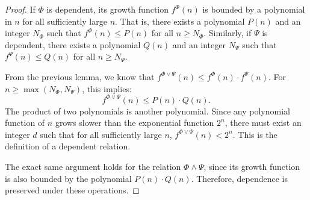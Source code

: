 \begin{proof}

    If $\Phi$ is dependent, its growth function $f^\Phi(n)$ is bounded by a polynomial in $n$ for all sufficiently large $n$. That is, there exists a polynomial $P(n)$ and an integer $N_\Phi$ such that $f^\Phi(n) \le P(n)$ for all $n \ge N_\Phi$. Similarly, if $\Psi$ is dependent, there exists a polynomial $Q(n)$ and an integer $N_\Psi$ such that $f^\Psi(n) \le Q(n)$ for all $n \ge N_\Psi$.

    From the previous lemma, we know that $f^{\Phi \lor \Psi}(n) \le f^\Phi(n) \cdot f^\Psi(n)$. For $n \ge \max(N_\Phi, N_\Psi)$, this implies:
    \[
        f^{\Phi \lor \Psi}(n) \le P(n) \cdot Q(n).
    \]
    The product of two polynomials is another polynomial. Since any polynomial function of $n$ grows slower than the exponential function $2^n$, there must exist an integer $d$ such that for all sufficiently large $n$, $f^{\Phi \lor \Psi}(n) < 2^n$. This is the definition of a dependent relation.

    The exact same argument holds for the relation $\Phi \land \Psi$, since its growth function is also bounded by the polynomial $P(n) \cdot Q(n)$. Therefore, dependence is preserved under these operations.
\end{proof}

